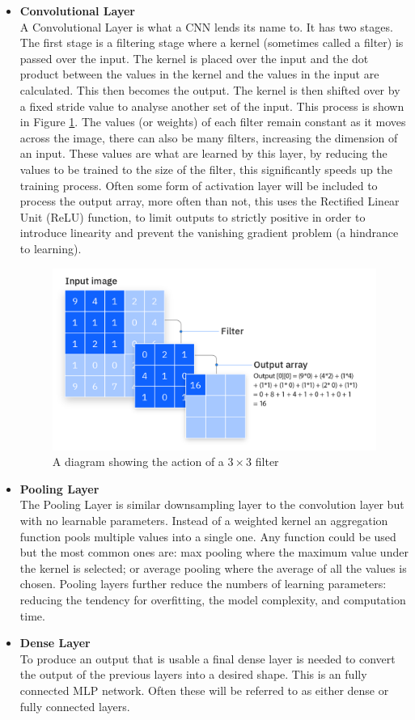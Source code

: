 \begin{itemize}
    \item \textbf{Convolutional Layer}\\
    A Convolutional Layer is what a CNN lends its name to. It has two stages. The first stage is a filtering stage where a kernel (sometimes called a filter) is passed over the input. The kernel is placed over the input and the dot product between the values in the kernel and the values in the input are calculated. This then becomes the output. The kernel is then shifted over by a fixed stride value to analyse another set of the input. This process is shown in Figure \ref{fig:filter}. The values (or weights) of each filter remain constant as it moves across the image, there can also be many filters, increasing the dimension of an input. These values are what are learned by this layer, by reducing the values to be trained to the size of the filter, this significantly speeds up the training process. Often some form of activation layer will be included to process the output array, more often than not, this uses the Rectified Linear Unit (ReLU) function, to limit outputs to strictly positive in order to introduce linearity and prevent the vanishing gradient problem (a hindrance to learning)\cite{ibmconvolutional}.
    
    \begin{figure}[h]
        \centering
        \includegraphics[width=0.5\linewidth]{dissertation//figures/cnn-filter.png}
        \caption{A diagram showing the action of a $3 \times 3$ filter\cite{ibmconvolutional}}
        \label{fig:filter}
    \end{figure}

    \item \textbf{Pooling Layer}\\
    The Pooling Layer is similar downsampling layer to the convolution layer but with no learnable parameters. Instead of a weighted kernel an aggregation function pools multiple values into a single one\cite{o2015introduction}. Any function could be used but the most common ones are: max pooling where the maximum value under the kernel is selected; or average pooling where the average of all the values is chosen. Pooling layers further reduce the numbers of learning parameters: reducing the tendency for overfitting, the model complexity, and computation time\cite{ibmconvolutional}.

    \item \textbf{Dense Layer}\\
    To produce an output that is usable a final dense layer is needed to convert the output of the previous layers into a desired shape. This is an fully connected MLP network. Often these will be referred to as either dense or fully connected layers.
\end{itemize}

